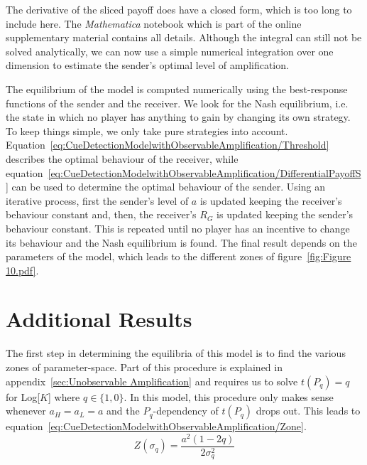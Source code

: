 \documentclass[a4paper,12pt]{article}
\numberwithin{equation}{section}
\numberwithin{figure}{section}
\begin{document}
The derivative of the sliced payoff does have a closed form, which is too long to include here. The \textit{Mathematica} notebook which is part of the online supplementary material contains all details. Although the integral can still not be solved analytically, we can now use a simple numerical integration over one dimension to estimate the sender's optimal level of amplification.

The equilibrium of the model is computed numerically using the best-response functions of the sender and the receiver. We look for the Nash equilibrium, i.e. the state in which no player has anything to gain by changing its own strategy. To keep things simple, we only take pure strategies into account. Equation~\ref{eq:CueDetectionModelwithObservableAmplification/Threshold} describes the optimal behaviour of the receiver, while equation~\ref{eq:CueDetectionModelwithObservableAmplification/DifferentialPayoffS} can be used to determine the optimal behaviour of the sender. Using an iterative process, first the sender's level of $a$ is updated keeping the receiver's behaviour constant and, then, the receiver's $R_G$ is updated keeping the sender's behaviour constant. This is repeated until no player has an incentive to change its behaviour and the Nash equilibrium is found. The final result depends on the parameters of the model, which leads to the different zones of figure~\ref{fig:Figure 10.pdf}.

\newpage


\section{Additional Results}
\label{sec:Additional Results}

The first step in determining the equilibria of this model is to find the various zones of parameter-space. Part of this procedure is explained in appendix~\ref{sec:Unobservable Amplification} and requires us to solve $t(P_{q})=q$ for Log[$K$] where $q \in \{1, 0\}$. In this model, this procedure only makes sense whenever $a_{H}=a_{L}=a$ and the $P_{q}$-dependency of $t(P_{q})$ drops out. This leads to equation~\ref{eq:CueDetectionModelwithObservableAmplification/Zone}.
\begin{equation}
\label{eq:CueDetectionModelwithObservableAmplification/Zone}
Z(\sigma_{q})=\frac{a^{2} (1 - 2 q)}{2 \sigma_{q}^{2}}
\end{equation}
\end{document}

